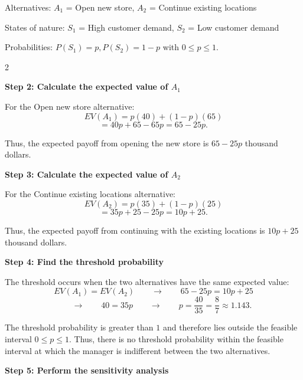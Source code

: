 	Alternatives:
	$A_1$ = Open new store,
	$A_2$ = Continue existing locations
	
	States of nature:
	$S_1$ = High customer demand,
	$S_2$ = Low customer demand
	
	Probabilities:
	$
	P(S_1)=p,
	P(S_2)=1-p
	$
	with
	$
	0\leq p\leq1.
	$
	
	\vspace{-3mm}
	
	\noindent
	\setlength{\columnseprule}{0.4pt} 
	\begin{multicols}{2}
		\vspace{0pt}
		
		\textbf{Step 2: Calculate the expected value of $A_1$}
		
		For the Open new store alternative:
		\[
		EV(A_1)
		=
		p(40)
		+
		(1-p)(65)
		\]
		\[
		=
		40p+65-65p
		=
		65-25p.
		\]
		
		Thus, the expected payoff from opening the new store is
		$65-25p$ thousand dollars.
		
		\columnbreak
		
		\textbf{Step 3: Calculate the expected value of $A_2$}
		
		For the Continue existing locations alternative:
		\[
		EV(A_2)
		=
		p(35)
		+
		(1-p)(25)
		\]
		\[
		=
		35p+25-25p
		=
		10p+25.
		\]
		
		Thus, the expected payoff from continuing with the existing locations is
		$10p+25$ thousand dollars.
		
	\end{multicols}
	
	
	\setlength{\columnseprule}{0pt}
	
	\textbf{Step 4: Find the threshold probability}
	
	The threshold occurs when the two alternatives have the same expected
	value:
	\[
	EV(A_1)=EV(A_2)
	\qquad \longrightarrow \qquad
	65-25p=10p+25
	\]
	\[
	\qquad \longrightarrow \qquad
	40=35p
	\qquad \longrightarrow \qquad
	p=\frac{40}{35}
	=\frac{8}{7}
	\approx1.143.
	\]
	
	The threshold probability is greater than $1$ and therefore lies outside
	the feasible interval $0\leq p\leq1$. Thus, there is no threshold probability
	within the feasible interval at which the manager is indifferent between
	the two alternatives.
	
	\textbf{Step 5: Perform the sensitivity analysis}
	
